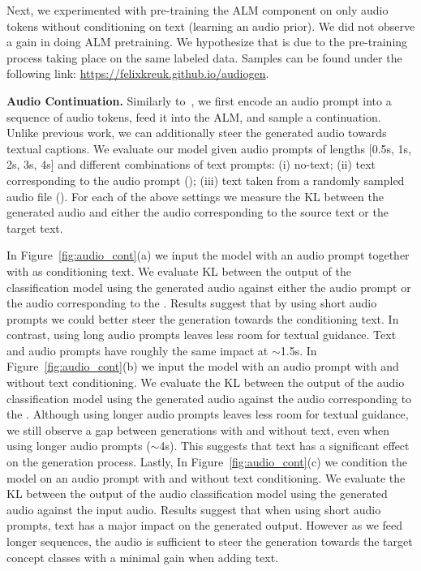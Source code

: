Next, we experimented with pre-training the \ac{ALM} component on only audio tokens without conditioning on text (learning an audio prior). 
We did not observe a gain in doing \ac{ALM} pretraining. We hypothesize that is due to the pre-training process taking place on the same labeled data. Samples can be found under the following link: \url{https://felixkreuk.github.io/audiogen}.








{\noindent \bf{Audio Continuation.}} Similarly to~\citep{lakhotia2021generative}, we first encode an audio prompt into a sequence of audio tokens, feed it into the \ac{ALM}, and sample a continuation. Unlike previous work, we can additionally steer the generated audio towards textual captions.
We evaluate our model given audio prompts of lengths [0.5s, 1s, 2s, 3s, 4s] and different combinations of text prompts: (i) no-text; (ii) text corresponding to the audio prompt (\src); (iii) text taken from a randomly sampled audio file (\rnd). For each of the above settings we measure the KL between the generated audio and either the audio corresponding to the source text or the target text. 

In Figure~\ref{fig:audio_cont}(a) we input the model with an audio prompt together with \rnd as conditioning text. We evaluate KL between the output of the classification model using the generated audio against either the audio prompt or the audio corresponding to the \rnd. Results suggest that by using short audio prompts we could better steer the generation towards the conditioning text. In contrast, using long audio prompts leaves less room for textual guidance. Text and audio prompts have roughly the same impact at $\sim$1.5s. In Figure~\ref{fig:audio_cont}(b) we input the model with an audio prompt with and without \rnd text conditioning. We evaluate the KL between the output of the audio classification model using the generated audio against the audio corresponding to the \rnd. Although using longer audio prompts leaves less room for textual guidance, we still observe a gap between generations with and without text, even when using longer audio prompts ($\sim$4s). This suggests that text has a significant effect on the generation process. Lastly, In Figure~\ref{fig:audio_cont}(c) we condition the model on an audio prompt with and without \src text conditioning. We evaluate the KL between the output of the audio classification model using the generated audio against the input audio. Results suggest that when using short audio prompts, text has a major impact on the generated output. However as we feed longer sequences, the audio is sufficient to steer the generation towards the target concept classes with a minimal gain when adding text.




